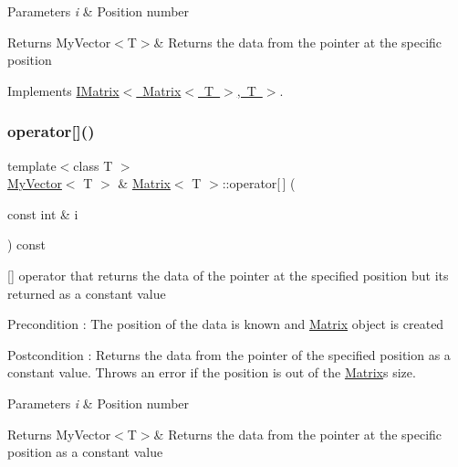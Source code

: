 \begin{DoxyParams}{Parameters}
{\em i} & Position number \\
\hline
\end{DoxyParams}
\begin{DoxyReturn}{Returns}
My\+Vector$<$\+T$>$\& Returns the data from the pointer at the specific position 
\end{DoxyReturn}


Implements \mbox{\hyperlink{class_i_matrix}{I\+Matrix$<$ Matrix$<$ T $>$, T $>$}}.

\mbox{\label{class_matrix_a56c7f18f272e74bee2b616eba702fc87}} 
\subsubsection{\texorpdfstring{operator[]()}{operator[]()}\hspace{0.1cm}{\footnotesize\ttfamily [2/2]}}
{\footnotesize\ttfamily template$<$class T $>$ \\
\mbox{\hyperlink{class_my_vector}{My\+Vector}}$<$ T $>$ \& \mbox{\hyperlink{class_matrix}{Matrix}}$<$ T $>$\+::operator\mbox{[}$\,$\mbox{]} (\begin{DoxyParamCaption}\item[{const int \&}]{i }\end{DoxyParamCaption}) const\hspace{0.3cm}{\ttfamily [virtual]}}



\mbox{[}\mbox{]} operator that returns the data of the pointer at the specified position but its returned as a constant value 

\begin{DoxyPrecond}{Precondition}
\+: The position of the data is known and \mbox{\hyperlink{class_matrix}{Matrix}} object is created 
\end{DoxyPrecond}
\begin{DoxyPostcond}{Postcondition}
\+: Returns the data from the pointer of the specified position as a constant value. Throws an error if the position is out of the \mbox{\hyperlink{class_matrix}{Matrix}}\textquotesingle{}s size. 
\end{DoxyPostcond}

\begin{DoxyParams}{Parameters}
{\em i} & Position number \\
\hline
\end{DoxyParams}
\begin{DoxyReturn}{Returns}
My\+Vector$<$\+T$>$\& Returns the data from the pointer at the specific position as a constant value 
\end{DoxyReturn}


